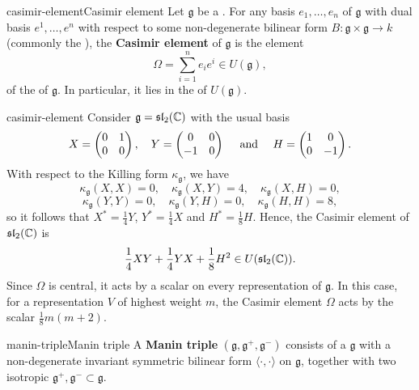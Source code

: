 \begin{topic}{casimir-element}{Casimir element}
    Let $\mathfrak{g}$ be a . For any basis $e_1, \ldots, e_n$ of $\mathfrak{g}$ with dual basis $e^1, \ldots, e^n$ with respect to some non-degenerate bilinear form $B \colon \mathfrak{g} \times \mathfrak{g} \to k$ (commonly the ), the \textbf{Casimir element} of $\mathfrak{g}$ is the element
    \[ \Omega = \sum_{i = 1}^{n} e_i e^i \in U(\mathfrak{g}) , \]
    of the  of $\mathfrak{g}$. In particular, it lies in the  of $U(\mathfrak{g})$.
\end{topic}

\begin{example}{casimir-element}
    Consider $\mathfrak{g} = \mathfrak{sl}_2(\mathbb{C})$ with the usual basis
    \[ X = \begin{pmatrix} 0 & 1 \\ 0 & 0 \end{pmatrix}, \quad Y = \begin{pmatrix} 0 & 0 \\ -1 & 0 \end{pmatrix} \quad \textup{ and } \quad H = \begin{pmatrix} 1 & 0 \\ 0 & -1 \end{pmatrix} . \]
    With respect to the Killing form $\kappa_\mathfrak{g}$, we have
    \[ \kappa_\mathfrak{g}(X, X) = 0, \quad \kappa_\mathfrak{g}(X, Y) = 4, \quad \kappa_\mathfrak{g}(X, H) = 0, \]
    \[ \kappa_\mathfrak{g}(Y, Y) = 0, \quad \kappa_\mathfrak{g}(Y, H) = 0, \quad \kappa_\mathfrak{g}(H, H) = 8, \]
    so it follows that $X^* = \frac{1}{4} Y$, $Y^* = \frac{1}{4} X$ and $H^* = \frac{1}{8} H$. Hence, the Casimir element of $\mathfrak{sl}_2(\mathbb{C})$ is
    \[ \frac{1}{4} XY + \frac{1}{4} YX + \frac{1}{8} H^2 \in U(\mathfrak{sl}_2(\mathbb{C})) . \]
    Since $\Omega$ is central, it acts by a scalar on every representation of $\mathfrak{g}$. In this case, for a representation $V$ of highest weight $m$, the Casimir element $\Omega$ acts by the scalar $\frac{1}{8} m(m + 2)$.
\end{example}

\begin{topic}{manin-triple}{Manin triple}
    A \textbf{Manin triple} $(\mathfrak{g}, \mathfrak{g}^+, \mathfrak{g}^-)$ consists of a  $\mathfrak{g}$ with a non-degenerate invariant symmetric bilinear form $\langle \cdot, \cdot \rangle$ on $\mathfrak{g}$, together with two isotropic  $\mathfrak{g}^+, \mathfrak{g}^- \subset \mathfrak{g}$.
\end{topic}

